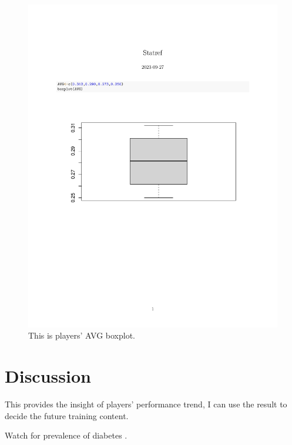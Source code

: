 \documentclass[12pt]{article}
\begin{document}
\begin{figure}[tbp]
  \centering
  \includegraphics[width=\textwidth]{stat.pdf}
  \caption{This is players' AVG boxplot.}
  \label{fig:stat}
\end{figure}

\section{Discussion}
\label{sec:disc}

This provides the insight of players' performance trend, I can use the result to decide the future training content.

\lipsum[1-2]
Watch for prevalence of diabetes \citep{wild2004global}.



\end{document}
